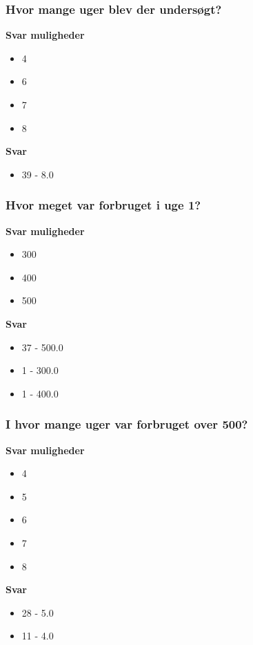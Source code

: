 \subsubsection{Hvor mange uger blev der undersøgt?}
\textbf{Svar muligheder}
\begin{itemize}
    \item 4
    \item 6
    \item 7
    \item 8
\end{itemize}

\textbf{Svar}
\begin{itemize}
    \item 39 - 8.0
\end{itemize}

\subsubsection{Hvor meget var forbruget i uge 1?}
\textbf{Svar muligheder}
\begin{itemize}
    \item 300
    \item 400
    \item 500
\end{itemize}

\textbf{Svar}
\begin{itemize}
    \item 37 - 500.0
    \item 1 - 300.0
    \item 1 - 400.0
\end{itemize}

\subsubsection{I hvor mange uger var forbruget over 500?}
\textbf{Svar muligheder}
\begin{itemize}
    \item 4
    \item 5
    \item 6
    \item 7
    \item 8
\end{itemize}

\textbf{Svar}
\begin{itemize}
    \item 28 - 5.0
    \item 11 - 4.0
\end{itemize}

